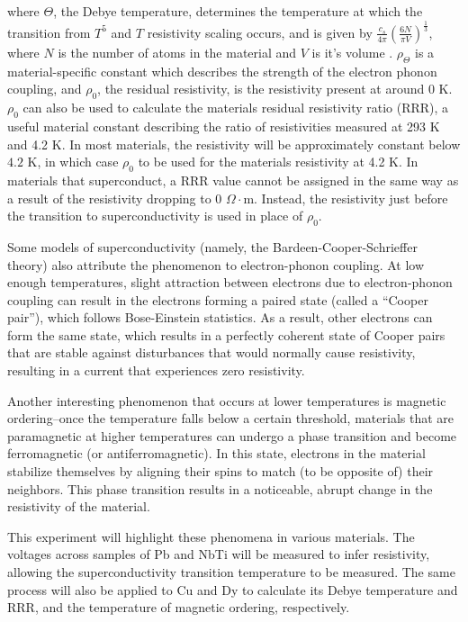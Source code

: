 \documentclass[prl,twocolumn,superscriptaddress,floatfix]{revtex4}
\begin{document}
where $\Theta$, the Debye temperature, determines the temperature at which the transition from $T^5$ and $T$ resistivity scaling occurs, and is given by $\frac{c_s}{4\pi}(\frac{6N}{\pi V})^{\frac{1}{3}}$, where $N$ is the number of atoms in the material and $V$ is it’s volume \cite{ZimanEP}. $\rho_{\Theta}$ is a material-specific constant which describes the strength of the electron phonon coupling, and $\rho_{0}$, the residual resistivity, is the resistivity present at around $0$ K. $\rho_{0}$ can also be used to calculate the materials residual resistivity ratio (RRR), a useful material constant describing the ratio of resistivities measured at 293 K and 4.2 K. In most materials, the resistivity will be approximately constant below $4.2$ K, in which case $\rho_0$ to be used for the materials resistivity at 4.2 K. In materials that superconduct, a RRR value cannot be assigned in the same way as a result of the resistivity dropping to 0 $\Omega \cdot$m. Instead, the resistivity just before the transition to superconductivity is used in place of $\rho_{0}$.

Some models of superconductivity (namely, the Bardeen-Cooper-Schrieffer theory) also attribute the phenomenon to electron-phonon coupling. At low enough temperatures, slight attraction between electrons due to electron-phonon coupling can result in the electrons forming a paired state (called a ``Cooper pair''), which follows Bose-Einstein statistics. As a result, other electrons can form the same state, which results in a perfectly coherent state of Cooper pairs that are stable against disturbances that would normally cause resistivity, resulting in a current that experiences zero resistivity.

Another interesting phenomenon that occurs at lower temperatures is magnetic ordering–once the temperature falls below a certain threshold, materials that are paramagnetic at higher temperatures can undergo a phase transition and become ferromagnetic (or antiferromagnetic). In this state, electrons in the material stabilize themselves by aligning their spins to match (to be opposite of) their neighbors. This phase transition results in a noticeable, abrupt change in the resistivity of the material.

This experiment will highlight these phenomena in various materials. The voltages across samples of Pb and NbTi will be measured to infer resistivity, allowing the superconductivity transition temperature to be measured. The same process will also be applied to Cu and Dy to calculate its Debye temperature and RRR, and the temperature of magnetic ordering, respectively.
\end{document}
